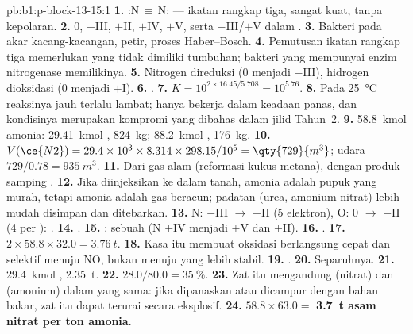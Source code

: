 \begin{solution}{pb:b1:p-block-13-15:1}
\textbf{1.} :N\,$\equiv$\,N: --- ikatan rangkap tiga, sangat kuat, tanpa
kepolaran.
\textbf{2.} 0, $-$III, $+$II, $+$IV, $+$V, serta $-$III/$+$V dalam .
\textbf{3.} Bakteri pada akar kacang-kacangan, petir, proses Haber--Bosch.
\textbf{4.} Pemutusan ikatan rangkap tiga memerlukan  yang tidak
dimiliki tumbuhan; bakteri yang mempunyai enzim nitrogenase memilikinya.
\textbf{5.} Nitrogen direduksi (0 menjadi $-$III), hidrogen dioksidasi (0
menjadi $+$I).
\textbf{6.} .
\textbf{7.} $K = 10^{2 \times 16.45/5.708} = 10^{5.76}$.
\textbf{8.} Pada \qty{25}{\celsius} reaksinya jauh terlalu lambat;
 hanya bekerja dalam keadaan panas, dan kondisinya merupakan
kompromi yang dibahas dalam jilid Tahun~2.
\textbf{9.} \qty{58.8}{kmol} amonia: \qty{29.41}{kmol} ,
\qty{824}{kg}; \qty{88.2}{kmol} , \qty{176}{kg}.
\textbf{10.} $V(\ce{N2}) = 29.4 \times 10^3 \times 8.314 \times 298.15/10^5 =
\qty{729}{m^3}$; udara $729/0.78 = \qty{935}{m^3}$.
\textbf{11.} Dari gas alam (reformasi kukus metana), dengan produk samping
.
\textbf{12.} Jika diinjeksikan ke dalam tanah, amonia adalah pupuk yang
murah, tetapi amonia adalah gas beracun; padatan (urea, amonium nitrat)
lebih mudah disimpan dan ditebarkan.
\textbf{13.} N: $-$III $\to$ $+$II (5 elektron), O: 0 $\to$ $-$II (4 per
): .
\textbf{14.} .
\textbf{15.} : sebuah  (N $+$IV
menjadi $+$V dan $+$II).
\textbf{16.} .
\textbf{17.} $2 \times 58.8 \times 32.0 = \qty{3.76}{t}$.
\textbf{18.} Kasa itu membuat oksidasi berlangsung cepat dan selektif
menuju NO, bukan menuju  yang lebih stabil.
\textbf{19.} .
\textbf{20.} Separuhnya.
\textbf{21.} \qty{29.4}{kmol} , \qty{2.35}{t}.
\textbf{22.} $28.0/80.0 = \qty{35}{\percent}$.
\textbf{23.} Zat itu mengandung  (nitrat) dan  (amonium)
dalam  yang sama: jika dipanaskan atau dicampur dengan bahan
bakar, zat itu dapat terurai secara eksplosif.
\textbf{24.} $58.8 \times 63.0 =$ \textbf{\qty{3.7}{t} asam nitrat per ton
amonia}.
\end{solution}
